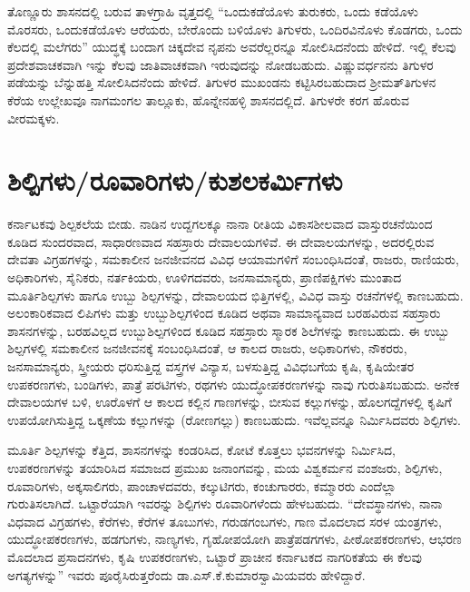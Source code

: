 ತೊಣ್ಣೂರು ಶಾಸನದಲ್ಲಿ ಬರುವ ತಾಳಗ್ರಾಹಿ ವೃತ್ತದಲ್ಲಿ “ಒಂದುಕಡೆಯೊಳು ತುರುಕರು, ಒಂದು ಕಡೆಯೊಳು ಮೊರಸರು, ಒಂದುಕಡೆಯೊಳು ಆರೆಯರು, ಬೇರೊಂದು ಬಳಿಯೊಳು ತಿಗುಳರು, ಒಂದಿರವಿನೊಳು ಕೊಡಗರು, ಒಂದು ಕೆಲದಲ್ಲಿ ಮಲೆಗರು” ಯುದ್ಧಕ್ಕೆ ಬಂದಾಗ ಚಿಕ್ಕದೇವ ನೃಪನು ಅವರೆಲ್ಲರನ್ನೂ ಸೋಲಿಸಿದನೆಂದು ಹೇಳಿದೆ. ಇಲ್ಲಿ ಕೆಲವು ಪ್ರದೇಶವಾಚಕವಾಗಿ ಇನ್ನು ಕೆಲವು ಜಾತಿವಾಚಕವಾಗಿ ಇರುವುದನ್ನು ನೋಡಬಹುದು. ವಿಷ್ಣುವರ್ಧನನು ತಿಗುಳರ ಪಡೆಯನ್ನು ಬೆನ್ನುಹತ್ತಿ ಸೋಲಿಸಿದನೆಂದು ಹೇಳಿದೆ. ತಿಗುಳರ ಮುಖಂಡನು ಕಟ್ಟಿಸಿರಬಹುದಾದ ಶ‍್ರೀಮತ್​ ತಿಗುಳನ ಕೆರೆಯ ಉಲ್ಲೇಖವೂ ನಾಗಮಂಗಲ ತಾಲ್ಲೂಕು, ಹೊನ್ನೇನಹಳ್ಳಿ ಶಾಸನದಲ್ಲಿದೆ. ತಿಗುಳರೇ ಕರಗ ಹೊರುವ ವೀರಮಕ್ಕಳು.


\section{ಶಿಲ್ಪಿಗಳು/ರೂವಾರಿಗಳು/ಕುಶಲಕರ್ಮಿಗಳು}

ಕರ್ನಾಟಕವು ಶಿಲ್ಪಕಲೆಯ ಬೀಡು. ನಾಡಿನ ಉದ್ದಗಲಕ್ಕೂ ನಾನಾ ರೀತಿಯ ವಿಕಾಸಶೀಲವಾದ ವಾಸ್ತುರಚನೆಯಿಂದ ಕೂಡಿದ ಸುಂದರವಾದ, ಸಾಧಾರಣವಾದ ಸಹಸ್ರಾರು ದೇವಾಲಯಗಳಿವೆ. ಈ ದೇವಾಲಯಗಳನ್ನು, ಅದರಲ್ಲಿರುವ ದೇವತಾ ವಿಗ್ರಹಗಳನ್ನು, ಸಮಕಾಲೀನ ಜನಜೀವನದ ವಿವಿಧ ಆಯಾಮಗಳಿಗೆ ಸಂಬಂಧಿಸಿದಂತೆ, ರಾಜರು, ರಾಣಿಯರು, ಅಧಿಕಾರಿಗಳು, ಸೈನಿಕರು, ನರ್ತಕಿಯರು, ಊಳಿಗದವರು, ಜನಸಾಮಾನ್ಯರು, ಪ್ರಾಣಿಪಕ್ಷಿಗಳು ಮುಂತಾದ ಮೂರ್ತಿಶಿಲ್ಪಗಳು ಹಾಗೂ ಉಬ್ಬು ಶಿಲ್ಪಗಳನ್ನು, ದೇವಾಲಯದ ಭಿತ್ತಿಗಳಲ್ಲಿ, ವಿವಿಧ ವಾಸ್ತು ರಚನೆಗಳಲ್ಲಿ ಕಾಣಬಹುದು. ಅಲಂಕಾರಿಕವಾದ ಲಿಪಿಗಳು ಮತ್ತು ಉಬ್ಬುಶಿಲ್ಪಗಳಿಂದ ಕೂಡಿದ ಅಥವಾ ಸಾಮಾನ್ಯವಾದ ಬರಹವಿರುವ ಸಹಸ್ರಾರು ಶಾಸನಗಳನ್ನು, ಬರಹವಿಲ್ಲದ ಉಬ್ಬುಶಿಲ್ಪಗಳಿಂದ ಕೂಡಿದ ಸಹಸ್ರಾರು ಸ್ಮಾರಕ ಶಿಲೆಗಳನ್ನು ಕಾಣಬಹುದು. ಈ ಉಬ್ಬು ಶಿಲ್ಪಗಳಲ್ಲಿ ಸಮಕಾಲೀನ ಜನಜೀವನಕ್ಕೆ ಸಂಬಂಧಿಸಿದಂತೆ, ಆ ಕಾಲದ ರಾಜರು, ಅಧಿಕಾರಿಗಳು, ನೌಕರರು, ಜನಸಾಮಾನ್ಯರು, ಸ್ತ್ರೀಯರು ಧರಿಸುತ್ತಿದ್ದ ವಸ್ತ್ರಗಳ ವಿನ್ಯಾಸ, ಬಳಸುತ್ತಿದ್ದ ವಿವಿಧಬಗೆಯ ಕೃಷಿ, ಕೃಷಿಯೇತರ ಉಪಕರಣಗಳು, ಬಂಡಿಗಳು, ಪಾತ್ರೆ ಪರಟಿಗಳು, ರಥಗಳು ಯುದ್ಧೋಪಕರಣಗಳನ್ನು ನಾವು ಗುರುತಿಸಬಹುದು. ಅನೇಕ ದೇವಾಲಯಗಳ ಬಳಿ, ಊರೊಳಗೆ ಆ ಕಾಲದ ಕಲ್ಲಿನ ಗಾಣಗಳನ್ನು, ಬೀಸುವ ಕಲ್ಲುಗಳನ್ನು, ಹೊಲಗದ್ದೆಗಳಲ್ಲಿ ಕೃಷಿಗೆ ಉಪಯೋಗಿಸುತ್ತಿದ್ದ ಒಕ್ಕಣೆಯ ಕಲ್ಲುಗಳನ್ನು (ರೋಣಗಲ್ಲು) ಕಾಣಬಹುದು. ಇವೆಲ್ಲವನ್ನೂ ನಿರ್ಮಿಸಿದವರು ಶಿಲ್ಪಿಗಳು.

ಮೂರ್ತಿ ಶಿಲ್ಪಗಳನ್ನು ಕೆತ್ತಿದ, ಶಾಸನಗಳನ್ನು ಕಂಡರಿಸಿದ, ಕೋಟೆ ಕೊತ್ತಲು ಭವನಗಳನ್ನು ನಿರ್ಮಿಸಿದ, ಉಪಕರಣ\-ಗಳನ್ನು ತಯಾರಿಸಿದ ಸಮಾಜದ ಪ್ರಮುಖ ಜನಾಂಗವನ್ನು, ಮಯ ವಿಶ್ವಕರ್ಮನ ವಂಶಜರು, ಶಿಲ್ಪಿಗಳು, ರೂವಾರಿಗಳು, ಅಕ್ಕಸಾಲಿಗರು, ಪಾಂಚಾಳದವರು, ಕಲ್ಕುಟಿಗರು, ಕಂಚುಗಾರರು, ಕಮ್ಮಾರರು ಎಂದೆಲ್ಲಾ ಗುರುತಿಸಲಾಗಿದೆ. ಒಟ್ಟಾರೆಯಾಗಿ ಇವರನ್ನು ಶಿಲ್ಪಿಗಳು ರೂವಾರಿಗಳೆಂದು ಹೇಳಬಹುದು. “ದೇವಸ್ಥಾನಗಳು, ನಾನಾ ವಿಧವಾದ ವಿಗ್ರಹಗಳು, ಕೆರೆಗಳು, ಕೆರೆಗಳ ತೂಬುಗಳು, ಗರುಡಗಂಬಗಳು, ಗಾಣ ಮೊದಲಾದ ಸರಳ ಯಂತ್ರಗಳು, ಯುದ್ಧೋಪಕರಣಗಳು, ಹಡಗುಗಳು, ನಾಣ್ಯಗಳು, ಗೃಹೋಪ\-ಯೋಗಿ ಪಾತ್ರೆಪಡಗಗಳು, ಪೀಠೋಪಕರಣಗಳು, ಆಭರಣ ಮೊದಲಾದ ಪ್ರಸಾದನಗಳು, ಕೃಷಿ ಉಪಕರಣಗಳು, ಒಟ್ಟಾರೆ ಪ್ರಾಚೀನ ಕರ್ನಾಟಕದ ನಾಗರಿಕತೆಯ ಈ ಕೆಲವು ಅಗತ್ಯಗಳನ್ನು” ಇವರು ಪೂರೈಸಿರುತ್ತರೆಂದು ಡಾ.ಎಸ್​.ಕೆ.ಕುಮಾರಸ್ವಾಮಿ\-ಯವರು ಹೇಳಿದ್ದಾರೆ.


